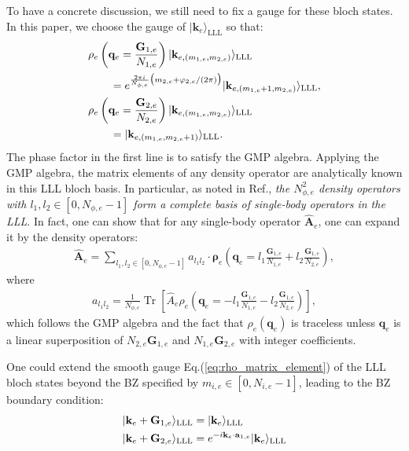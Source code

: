 To have a concrete discussion, we still need to fix a gauge for these bloch states. In this paper, we choose the gauge of $|\mathbf k_e\rangle_{\text{LLL}}$ so that:
\begin{align}
&\rho_e\left(\mathbf q_e=\frac{\mathbf G_{1,e}}{N_{1,e}}\right)|\mathbf k_{e,(m_{1,e},m_{2,e})}\rangle_{\text{LLL}}\notag\\
&\quad\quad=e^{\frac{2\pi i}{N_{\phi,e}}\big(m_{2,e}+\varphi_{2,e}/(2\pi)\big)}|\mathbf k_{e,(m_{1,e}+1,m_{2,e})}\rangle_{\text{LLL}},\notag\\
&\rho_e\left(\mathbf q_e=\frac{\mathbf G_{2,e}}{N_{2,e}}\right)|\mathbf k_{e,(m_{1,e},m_{2,e})}\rangle_{\text{LLL}}\notag\\
&\quad\quad=|\mathbf k_{e,(m_{1,e},m_{2,e}+1)}\rangle_{\text{LLL}}.\label{eq:rho_matrix_element}
\end{align}
The phase factor in the first line is to satisfy the GMP algebra. Applying the GMP algebra, the matrix elements of any density operator are analytically known in this LLL bloch basis. In particular, as noted in Ref.\cite{murthy2012hamiltonian}, \emph{the $N_{\phi,e}^2$ density operators with $l_1,l_2\in [0,N_{\phi,e}-1]$ form a complete basis of single-body operators in the LLL}. In fact, one can show that for any single-body operator $\hat{\mathbf A}_e$, one can expand it by the density operators:
\begin{align}
\hat{\mathbf A}_e=\sum_{l_1,l_2\in [0,N_{\phi,e}-1]} a_{l_1 l_2}\cdot\pmb{\boldsymbol\rho}_e\left(\mathbf q_e=l_1\frac{\mathbf G_{1,e}}{N_{1,e}}+l_2\frac{\mathbf G_{1,e}}{N_{2,e}}\right),
\end{align}
where
\begin{align}
a_{l_1 l_2}=\frac{1}{N_{\phi,e}}\mathop{\mathrm{Tr}}\left[\hat A_e\rho_e\left(\mathbf q_e=-l_1\frac{\mathbf G_{1,e}}{N_{1,e}}-l_2\frac{\mathbf G_{1,e}}{N_{2,e}}\right)\right],
\end{align}
which follows the GMP algebra and the fact that $\rho_e(\mathbf q_e)$ is traceless unless $\mathbf q_e$ is a linear superposition of $N_{2,e}\mathbf G_{1,e}$ and $N_{1,e}\mathbf G_{2,e}$ with integer coefficients.



One could extend the smooth gauge Eq.(\ref{eq:rho_matrix_element}) of the LLL bloch states beyond the BZ specified by $m_{i,e}\in [0,N_{i,e}-1]$, leading to the BZ boundary condition:
\begin{align}
|\mathbf k_e+\mathbf G_{1,e}\rangle_{\text{LLL}}&=|\mathbf k_e\rangle_{\text{LLL}}\notag\\
|\mathbf k_e+\mathbf G_{2,e}\rangle_{\text{LLL}}&=e^{-i \mathbf k_e\cdot\mathbf a_{1,e}}|\mathbf k_e\rangle_{\text{LLL}}\label{eq:BZ_BC}
\end{align}


